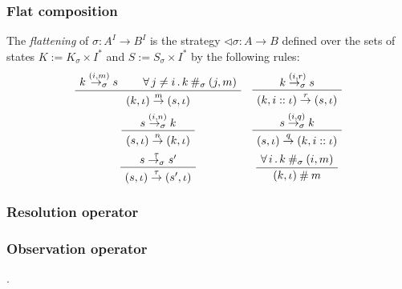 \subsubsection{Flat composition}

\begin{definition}
The \emph{flattening} of $\sigma : A^I \rightarrow B^I$
is the strategy $\lhd \sigma : A \rightarrow B$
defined over the sets of states
$K := K_\sigma \times I^*$ and
$S := S_\sigma \times I^*$ by the following rules:
\[
  \begin{array}{c@{\quad}c}
    \AxiomC{$k \stackrel{(i, m)}{\rightarrow_\sigma} s$}
    \AxiomC{$\forall \, j \ne i \,.\, k \: \#_\sigma \: (j, m)$}
    \BinaryInfC{$(k, \iota) \stackrel{m}{\rightarrow} (s, \iota)$}
    \DisplayProof
    &
    \AxiomC{$k \stackrel{(i, r)}{\rightarrow_\sigma} s$}
    \UnaryInfC{$(k, i :: \iota) \stackrel{r}{\rightarrow} (s, \iota)$}
    \DisplayProof
    \\[1.5em]
    \AxiomC{$s \stackrel{(i, n)}{\rightarrow_\sigma} k$}
    \UnaryInfC{$(s, \iota) \stackrel{n}{\rightarrow} (k, \iota)$}
    \DisplayProof
    &
    \AxiomC{$s \stackrel{(i, q)}{\rightarrow_\sigma} k$}
    \UnaryInfC{$(s, \iota) \stackrel{q}{\rightarrow} (k, i :: \iota)$}
    \DisplayProof
    \\[1.5em]
    \AxiomC{$s \stackrel{\tau}{\rightarrow_\sigma} s'$}
    \UnaryInfC{$(s, \iota) \stackrel{\tau}{\rightarrow} (s', \iota)$}
    \DisplayProof
    &
    \AxiomC{$\forall \,i\,.\, k \: \#_\sigma \: (i, m)$}
    \UnaryInfC{$(k, \iota) \:\#\: m$}
    \DisplayProof
  \end{array}
\]
\end{definition}

\subsubsection{Resolution operator}



\subsubsection{Observation operator}

.\\

